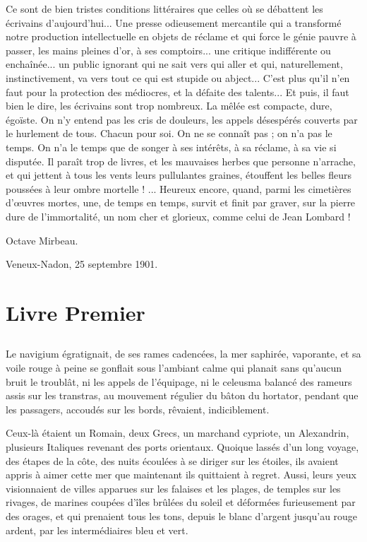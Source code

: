 \documentclass[a4paper, 11pt, oneside, polutonikogreek, french]{article}
\begin{document}
Ce sont de bien tristes conditions littéraires que celles où se débattent les écrivains d'aujourd'hui... Une presse odieusement mercantile qui a transformé notre production intellectuelle en objets de réclame et qui force le génie pauvre à passer, les mains pleines d'or, à ses comptoirs... une critique indifférente ou enchaînée... un public ignorant qui ne sait vers qui aller et qui, naturellement, instinctivement, va vers tout ce qui est stupide ou abject... C'est plus qu'il n'en faut pour la protection des médiocres, et la défaite des talents... Et puis, il faut bien le dire, les écrivains sont trop nombreux. La mêlée est compacte, dure, égoïste. On n'y entend pas les cris de douleurs, les appels désespérés couverts par le hurlement de tous. Chacun pour soi. On ne se connaît pas ; on n'a pas le temps. On n'a le temps que de songer à ses intérêts, à sa réclame, à sa vie si disputée. Il paraît trop de livres, et les mauvaises herbes que personne n'arrache, et qui jettent à tous les vents leurs pullulantes graines, étouffent les belles fleurs poussées à leur ombre mortelle ! ... Heureux encore, quand, parmi les cimetières d'œuvres mortes, une, de temps en temps, survit et finit par graver, sur la pierre dure de l'immortalité, un nom cher et glorieux, comme celui de Jean Lombard !

Octave Mirbeau.

Veneux-Nadon, 25 septembre 1901.
\clearpage
\section{Livre Premier}
\subsection{}
\paragraph{}
Le navigium égratignait, de ses rames cadencées, la mer saphirée, vaporante, et sa voile rouge à peine se gonflait sous l'ambiant calme qui planait sans qu'aucun bruit le troublât, ni les appels de l'équipage, ni le celeusma balancé des rameurs assis sur les transtras, au mouvement régulier du bâton du hortator, pendant que les passagers, accoudés sur les bords, rêvaient, indiciblement.

Ceux-là étaient un Romain, deux Grecs, un marchand cypriote, un Alexandrin, plusieurs Italiques revenant des ports orientaux. Quoique lassés d'un long voyage, des étapes de la côte, des nuits écoulées à se diriger sur les étoiles, ils avaient appris à aimer cette mer que maintenant ils quittaient à regret. Aussi, leurs yeux visionnaient de villes apparues sur les falaises et les plages, de temples sur les rivages, de marines coupées d'îles brûlées du soleil et déformées furieusement par des orages, et qui prenaient tous les tons, depuis le blanc d'argent jusqu'au rouge ardent, par les intermédiaires bleu et vert.
\end{document}
